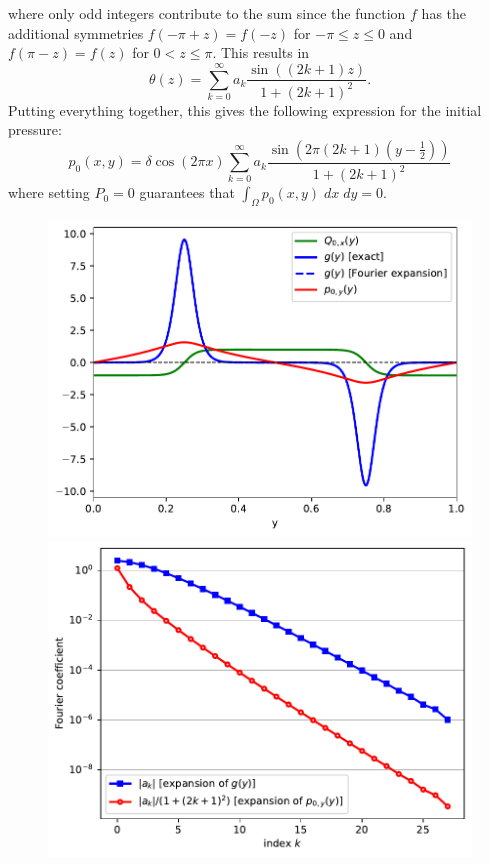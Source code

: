\documentclass[11pt]{article}
\begin{document}
where only odd integers contribute to the sum since the function $f$ has the additional symmetries $f(-\pi+z)=f(-z)$ for $-\pi\le z\le 0$ and $f(\pi-z)=f(z)$ for $0<z\le \pi$.
This results in
\begin{equation}
    \theta(z) = \sum_{k=0}^{\infty} a_k\frac{\sin((2k+1) z)}{1+(2k+1)^2} \label{eqn:fourier_series_theta}.
\end{equation}
Putting everything together, this gives the following expression for the initial pressure:
\begin{equation}
    p_0(x,y) = \delta \cos(2\pi x) \sum_{k=0}^{\infty} a_k\frac{\sin\left(2\pi (2k+1)\left(y-\tfrac{1}{2}\right)\right)}{1+(2k+1)^2}\label{eqn:fourier_series_final}
\end{equation}
where setting $P_0=0$ guarantees that $\int_\Omega p_0(x,y)\;dx\;dy = 0$.
\begin{figure}
    \begin{minipage}{0.45\linewidth}
        \begin{center}
            \includegraphics[width=\linewidth]{figures/shear_flow_initial_condition.pdf}
        \end{center}
    \end{minipage}
    \hfill
    \begin{minipage}{0.45\linewidth}
        \begin{center}
            \includegraphics[width=\linewidth]{figures/shear_flow_fourier_coefficients.pdf}

\end{center}
\end{minipage}
\end{figure}
\end{document}
